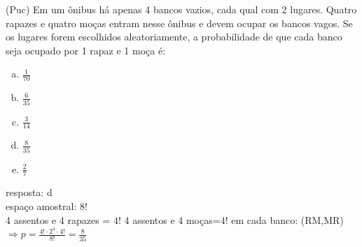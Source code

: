 \begin{ex}
  (Puc) Em um ônibus há apenas 4 bancos vazios, cada qual com 2 lugares. Quatro rapazes e quatro moças entram nesse ônibus e devem ocupar os bancos vagos. Se os lugares forem escolhidos aleatoriamente, a probabilidade de que cada banco seja ocupado por 1 rapaz e 1 moça é: 
    \begin{enumerate} [(a)]
        \item $\frac{1}{70}$
        \item $\frac{6}{35}$
        \item $\frac{3}{14}$
        \item $\frac{8}{35}$
        \item $\frac{2}{7}$
    \end{enumerate}
     \begin{sol}
      resposta: d \\
      espaço amostral: $8!$ \\
      4 assentos e 4 rapazes = $4!$ \hspace{0,4cm} 4 assentos e 4 moças=$4!$ \hspace{0,4cm} em cada banco: (RM,MR) \\
      $\Longrightarrow p=\frac{4!\cdot2^4\cdot4!}{8!}=\frac{8}{35}$
     \end{sol}
 \end{ex}